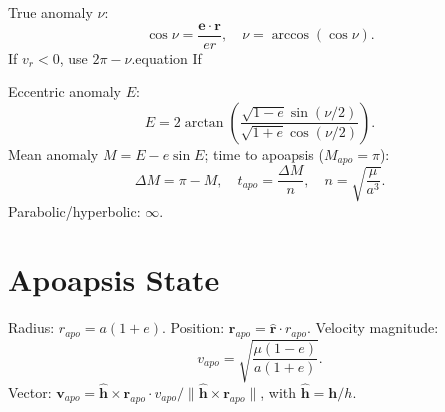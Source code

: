 \documentclass{article}
\begin{document}
True anomaly $\nu$:
\begin{equation}
\cos \nu = \frac{\mathbf{e} \cdot \mathbf{r}}{e r}, \quad \nu = \arccos(\cos \nu).
\end{equation}
If $v_r < 0$, use $2\pi - \nu$.{equation}
If

Eccentric anomaly $E$:
\begin{equation}
E = 2 \arctan \left( \frac{\sqrt{1 - e} \sin(\nu/2)}{\sqrt{1 + e} \cos(\nu/2)} \right).
\end{equation}
Mean anomaly $M = E - e \sin E$; time to apoapsis ($M_{apo} = \pi$):
\begin{equation}
\Delta M = \pi - M, \quad t_{apo} = \frac{\Delta M}{n}, \quad n = \sqrt{\frac{\mu}{a^3}}.
\end{equation}
Parabolic/hyperbolic: $\infty$.

\section{Apoapsis State}
Radius: $r_{apo} = a (1 + e)$. Position: $\mathbf{r}_{apo} = \hat{\mathbf{r}} \cdot r_{apo}$. Velocity magnitude:
\begin{equation}
v_{apo} = \sqrt{\frac{\mu (1 - e)}{a (1 + e)}}.
\end{equation}
Vector: $\mathbf{v}_{apo} = \hat{\mathbf{h}} \times \mathbf{r}_{apo} \cdot v_{apo} / \|\hat{\mathbf{h}} \times \mathbf{r}_{apo}\|$, with $\hat{\mathbf{h}} = \mathbf{h} / h$.
\end{document}
